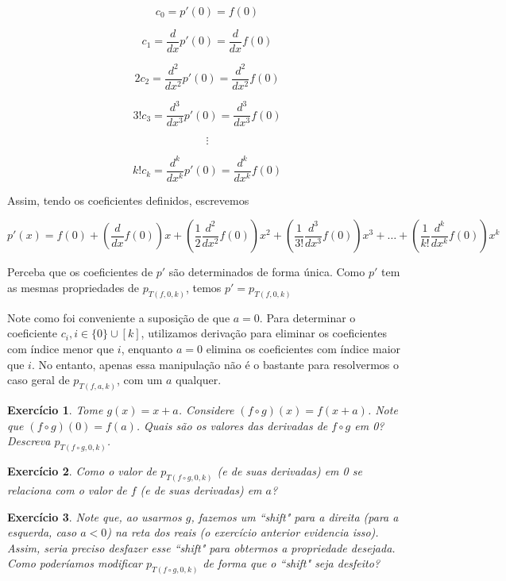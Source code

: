 \documentclass[]{article}
\newtheorem{exercicio}{Exercício}
\numberwithin{equation}{section}
\begin{document}
$$
c_0 = p'(0) = f(0)
$$

$$
c_1 = \frac{d}{dx} p'(0) = \frac{d}{dx} f(0)
$$

$$
2c_2 = \frac{d^2}{dx^2} p'(0) = \frac{d^2}{dx^2} f(0)
$$

$$
3!c_3 = \frac{d^3}{dx^3} p'(0) = \frac{d^3}{dx^3} f(0)
$$

$$
\vdots
$$

$$
k!c_k = \frac{d^k}{dx^k} p'(0) = \frac{d^k}{dx^k} f(0)
$$

Assim, tendo os coeficientes definidos, escrevemos

$$
p'(x) = f(0) + \left(\frac{d}{dx} f(0)\right)x + \left(\frac{1}{2} \frac{d^2}{dx^2} f(0)\right)x^2 + \left(\frac{1}{3!} \frac{d^3}{dx^3} f(0)\right)x^3 + \dots + \left(\frac{1}{k!} \frac{d^k}{dx^k} f(0)\right)x^k
$$

Perceba que os coeficientes de $p'$ são determinados de forma
única. Como $p'$ tem as mesmas propriedades de $p_{T(f, 0, k)}$, temos
$p' = p_{T(f, 0, k)}$

Note como foi conveniente a suposição de que $a = 0$. Para determinar
o coeficiente $c_i, i \in \{0\} \cup [k]$, utilizamos derivação para
eliminar os coeficientes com índice menor que $i$, enquanto $a = 0$
elimina os coeficientes com índice maior que $i$. No entanto, apenas
essa manipulação não é o bastante para resolvermos o caso geral de
$p_{T(f, a, k)}$, com um $a$ qualquer.

\begin{exercicio}
  Tome $g(x) = x + a$. Considere $(f \circ g)(x) = f(x + a)$. Note que
  $(f \circ g)(0) = f(a)$. Quais são os valores das derivadas de
  $f \circ g$ em 0? Descreva $p_{T(f \circ g, 0, k)}$.
\end{exercicio}

\begin{exercicio}
  Como o valor de $p_{T(f \circ g, 0, k)}$ (e de suas derivadas) em 0
  se relaciona com o valor de $f$ (e de suas derivadas) em $a$?
\end{exercicio}

\begin{exercicio}
  Note que, ao usarmos $g$, fazemos um ``shift" para a direita (para a
  esquerda, caso $a < 0$) na reta dos reais (o exercício anterior
  evidencia isso). Assim, seria preciso desfazer esse ``shift" para
  obtermos a propriedade desejada. Como poderíamos modificar
  $p_{T(f \circ g, 0, k)}$ de forma que o ``shift" seja desfeito?
\end{exercicio}
\end{document}
